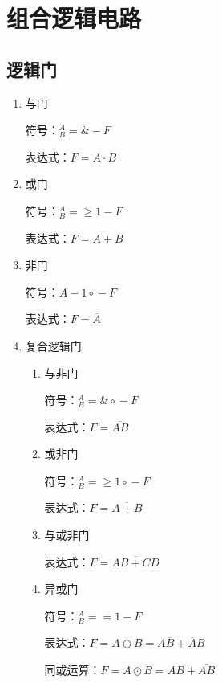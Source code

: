 \chapter{组合逻辑电路}
\newpage

\section{逻辑门}

\begin{enumerate}

    \item 与门

          符号：$^A_B\!\!=\!\!\boxed{\&}\!\!-\!\!{\scriptstyle F}$

          表达式：$F=A \cdot B$

    \item 或门

          符号：$^A_B\!\!=\!\!\boxed{\geq{1}}\!\!-\!\!{\scriptstyle F}$

          表达式：$F=A+B$

    \item 非门

          符号：$A\!\!-\!\!\boxed{1}{\scriptstyle\circ}\!\!-\!\!{\scriptstyle F}$

          表达式：$F=\overline A$

    \item 复合逻辑门

          \begin{enumerate}

              \item 与非门

                    符号：$^A_B\!\!=\!\!\boxed{\&}{\scriptstyle\circ} \!\!-\!\!{\scriptstyle F}$

                    表达式：$F=\overline{AB}$

              \item 或非门

                    符号：$^A_B\!\!=\!\!\boxed{\geq{1}}{\scriptstyle\circ} \!\!-\!\!{\scriptstyle F}$

                    表达式：$F=\overline{A+B}$

              \item 与或非门

                    表达式：$F=\overline{AB+CD}$

              \item 异或门

                    符号：$^A_B\!\!=\!\!\boxed{={1}} \!\!-\!\!{\scriptstyle F}$

                    表达式：$F=A\oplus{}B=A\overline{B}+\overline{A}B$

                    同或运算：$F=A\odot{}B=AB+\overline{AB}$

          \end{enumerate}

\end{enumerate}

